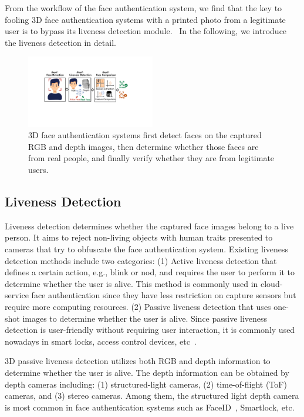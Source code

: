 From the workflow of the face authentication system, we find that the key to fooling 3D face authentication systems with a printed photo from a legitimate user is to bypass its liveness detection module.  In the following, we introduce the liveness detection in detail.

\begin{figure}[pt]
	\centerline{\includegraphics[width = 0.5\textwidth]{figures/face_auth_workflow.pdf}}
	\vspace{-0.15in}
	\caption{3D face authentication systems first detect faces on the captured RGB and depth images, then determine whether those faces are from real people, and finally  verify whether they are from legitimate users. }
	\label{fas_workflow}
	\vspace{-0.15in}
\end{figure}

\subsection{Liveness Detection}
Liveness detection  determines
whether the captured face images belong to a live person. It aims to reject non-living objects with human traits presented to cameras that try to obfuscate the face authentication system. 
Existing liveness detection methods include two categories: (1) Active liveness detection that defines a certain action, e.g., blink or nod, and requires the user to perform it to determine whether the user is alive. This method is commonly used in cloud-service face authentication since they have less restriction on capture sensors but require more computing resources. (2) Passive liveness detection that uses one-shot images to determine whether the user is alive. 
Since passive liveness detection is user-friendly without requiring user interaction, it is commonly used nowadays in smart locks, access control devices, etc~\cite{chakraborty2014overview}. 

3D passive liveness detection utilizes both RGB and depth information to determine whether the user is alive. The depth information can be obtained by depth cameras including: (1) structured-light cameras, (2) time-of-flight (ToF) cameras, and (3) stereo cameras. Among them, the structured light depth camera is most common in face authentication systems such as FaceID~\cite{han2007face,bud2018facing}, Smartlock\cite{waseem2020face}, etc.


